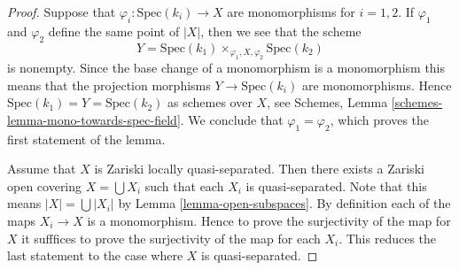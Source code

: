 \begin{proof}
Suppose that $\varphi_i : \text{Spec}(k_i) \to X$ are monomorphisms
for $i = 1, 2$. If $\varphi_1$ and $\varphi_2$ define the same point
of $|X|$, then we see that the scheme
$$
Y = \text{Spec}(k_1) \times_{\varphi_1, X, \varphi_2} \text{Spec}(k_2)
$$
is nonempty. Since the base change of a monomorphism is a monomorphism
this means that the projection morphisms $Y \to \text{Spec}(k_i)$
are monomorphisms. Hence $\text{Spec}(k_1) = Y = \text{Spec}(k_2)$
as schemes over $X$, see
Schemes, Lemma \ref{schemes-lemma-mono-towards-spec-field}.
We conclude that $\varphi_1 = \varphi_2$, which proves the first statement
of the lemma.

\medskip\noindent
Assume that $X$ is Zariski locally quasi-separated.
Then there exists a Zariski open covering $X = \bigcup X_i$
such that each $X_i$ is quasi-separated. Note that this means
$|X| = \bigcup |X_i|$ by Lemma \ref{lemma-open-subspaces}.
By definition each of the maps
$X_i \to X$ is a monomorphism. Hence to prove the surjectivity
of the map for $X$ it sufffices to prove the surjectivity of the
map for each $X_i$. This reduces the last statement to the case
where $X$ is quasi-separated.


\end{proof}
